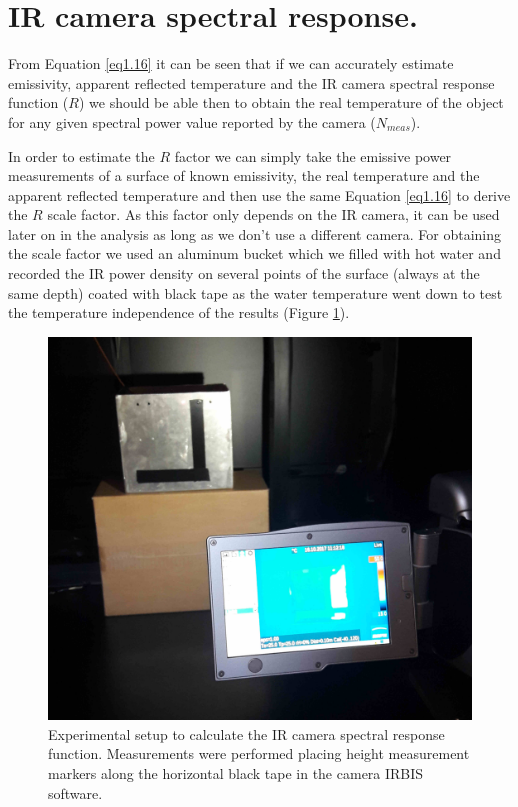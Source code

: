 	\section{IR camera spectral response.}\label{section3.2}
	
		From Equation \ref{eq1.16} it can be seen that if we can accurately estimate emissivity, apparent reflected temperature and the IR camera spectral response function ($R$) we should be able then to obtain the real temperature of the object for any given spectral power value reported by the camera ($N_{meas}$). 
		
		In order to estimate the $R$ factor we can simply take the emissive power measurements of a surface of known emissivity, the real temperature and the apparent reflected temperature and then use the same Equation \ref{eq1.16} to derive the $R$ scale factor. As this factor only depends on the IR camera, it can be used later on in the analysis as long as we don’t use a different camera.
		For obtaining the scale factor we used an aluminum bucket which we filled with hot water and recorded the IR power density on several points of the surface (always at the same depth) coated with black tape as the water temperature went down to test the temperature independence of the results (Figure \ref{fig3.1}).
		
		\begin{figure}[ht!]
			\centering
			\captionsetup{justification=centering,margin=2cm}
			\includegraphics[scale=0.10]{Figures/Chapter03/CameraAndBucket.jpg}
			\caption{Experimental setup to calculate the IR camera spectral response function. Measurements were performed placing height measurement markers along the horizontal black tape in the camera IRBIS software.}\label{fig3.1}
		\end{figure}
		
